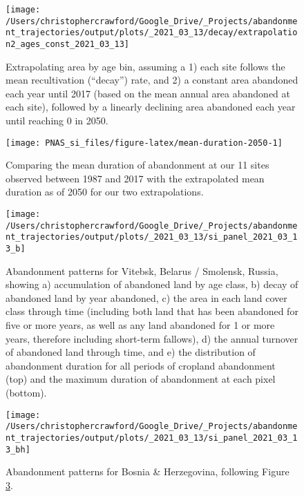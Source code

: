 \documentclass[9pt,lineno]{pnas-new}
\begin{document}
\begin{figure}
\texttt{[image: /Users/christophercrawford/Google\_Drive/\_Projects/abandonment\_trajectories/output/plots/\_2021\_03\_13/decay/extrapolation2\_ages\_const\_2021\_03\_13]} \caption{Extrapolating area by age bin, assuming a 1) each site follows the mean recultivation (``decay'') rate, and 2) a constant area abandoned each year until 2017 (based on the mean annual area abandoned at each site), followed by a linearly declining area abandoned each year until reaching 0 in 2050.}\label{fig:extrapolation2-area-by-age}
\end{figure}



\begin{figure}
\texttt{[image: PNAS\_si\_files/figure-latex/mean-duration-2050-1]} \caption{Comparing the mean duration of abandonment at our 11 sites observed between 1987 and 2017 with the extrapolated mean duration as of 2050 for our two extrapolations.}\label{fig:mean-duration-2050}
\end{figure}














\begin{figure}
\texttt{[image: /Users/christophercrawford/Google\_Drive/\_Projects/abandonment\_trajectories/output/plots/\_2021\_03\_13/si\_panel\_2021\_03\_13\_b]} \caption{Abandonment patterns for Vitebsk, Belarus / Smolensk, Russia, showing a) accumulation of abandoned land by age class, b) decay of abandoned land by year abandoned, c) the area in each land cover class through time (including both land that has been abandoned for five or more years, as well as any land abandoned for 1 or more years, therefore including short-term fallows), d) the annual turnover of abandoned land through time, and e) the distribution of abandonment duration for all periods of cropland abandonment (top) and the maximum duration of abandonment at each pixel (bottom).}\label{fig:panel-b}
\end{figure}

\begin{figure}
\texttt{[image: /Users/christophercrawford/Google\_Drive/\_Projects/abandonment\_trajectories/output/plots/\_2021\_03\_13/si\_panel\_2021\_03\_13\_bh]} \caption{Abandonment patterns for Bosnia \& Herzegovina, following Figure \ref{fig:panel-b}.}\label{fig:panel-bh}
\end{figure}
\end{document}
